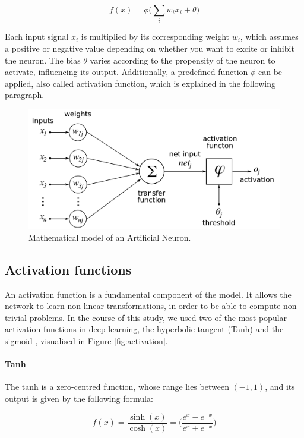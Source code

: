\begin{Equation}[!h]
	\centering
	\begin{equation}
	f(x)=\phi \bigg( \sum_{i}w_{i}x_i + \theta \bigg)
	\end{equation}
	\caption[Mathematical description of traditional \glspl{ann}.]{Function that 
	describes mathematically the traditional \glspl{ann} in terms of weighted sum.}
	\label{eq:mathmodel}
\end{Equation}
Each input signal $x_i$ is multiplied by its corresponding weight $w_{i}$, which 
assumes a positive or negative value depending on whether you want to excite or 
inhibit the neuron.
The bias $\theta$ varies according to the propensity of the neuron to activate, 
influencing its output.
Additionally, a predefined function $\phi$ can be applied, also called activation 
function, which is explained in the following paragraph.

\begin{figure}[htb]
	\centering
	\includegraphics[width=.7\textwidth]{contents/images/ArtificialNeuronModel}
	\caption{Mathematical model of an Artificial Neuron.}
	\label{fig:neuron}
	\vspace{-0.5cm}
\end{figure}

\subsection{Activation functions}
\label{subsec:activationfun}

An activation function is a fundamental component of the model. It allows the 
network to learn non-linear transformations, in order to be able to compute 
non-trivial problems.
In the course of this study, we used two of the most popular activation functions  
in deep learning, the {hyperbolic tangent} (Tanh) \cite[][]{kalman1992tanh} 
and the {sigmoid} \cite[][]{han1995influence}, visualised in Figure 
\ref{fig:activation}.

\paragraph*{Tanh}
The tanh is a zero-centred function, whose range lies between $(-1, 1)$, and its 
output is given by the following formula:
\begin{Equation}[H]
	\centering
	\begin{equation}
	f(x)= \frac{\sinh (x)}{\cosh (x)} = \bigg( \frac{e^x - e^{-x}}{e^x + 
		e^{-x}}\bigg)
	\end{equation}
	\caption{Hyperbolic Tangent Function (Tanh).}
	\label{eq:tanh}
\end{Equation}

